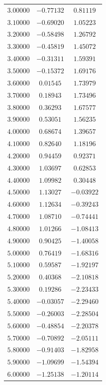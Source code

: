 \documentclass[a4paper,10pt]{article}
\begin{document}
\begin{center}
\begin{longtable}{ |c|c|c| }
$   3.00000 $ & $ -0.77132 $ & $  0.81119$\\
$   3.10000 $ & $ -0.69020 $ & $  1.05223$\\
$   3.20000 $ & $ -0.58498 $ & $  1.26792$\\
$   3.30000 $ & $ -0.45819 $ & $  1.45072$\\
$   3.40000 $ & $ -0.31311 $ & $  1.59391$\\
$   3.50000 $ & $ -0.15372 $ & $  1.69176$\\
$   3.60000 $ & $  0.01545 $ & $  1.73979$\\
$   3.70000 $ & $  0.18943 $ & $  1.73496$\\
$   3.80000 $ & $  0.36293 $ & $  1.67577$\\
$   3.90000  $ & $ 0.53051 $ & $  1.56235$\\
$   4.00000  $ & $ 0.68674 $ & $  1.39657$\\
$   4.10000 $ & $  0.82640  $ & $ 1.18196$\\
$   4.20000 $ & $  0.94459 $ & $  0.92371$\\
$   4.30000$ & $   1.03697$ & $   0.62853$\\
$   4.40000  $ & $ 1.09982  $ & $ 0.30448$\\
$   4.50000  $ & $ 1.13027 $ & $ -0.03922$\\
$   4.60000 $ & $  1.12634$ & $  -0.39243$\\
$   4.70000  $ & $ 1.08710  $ & $-0.74441$\\
$   4.80000 $ & $  1.01266 $ & $ -1.08413$\\
$   4.90000 $ & $  0.90425 $ & $ -1.40058$\\
$   5.00000  $ & $ 0.76419$ & $  -1.68316$\\
$   5.10000 $ & $  0.59587 $ & $ -1.92197$\\
$   5.20000 $ & $  0.40368 $ & $ -2.10818$\\
$   5.30000 $ & $  0.19286 $ & $ -2.23433$\\
$   5.40000  $ & $-0.03057 $ & $ -2.29460$\\
$   5.50000 $ & $ -0.26003 $ & $ -2.28504$\\
$   5.60000 $ & $ -0.48854 $ & $ -2.20378$\\
$   5.70000  $ & $-0.70892 $ & $ -2.05111$\\
$   5.80000 $ & $ -0.91403 $ & $ -1.82958$\\
$   5.90000 $ & $ -1.09699 $ & $ -1.54394$\\
$   6.00000  $ & $-1.25138 $ & $ -1.20114$\\

\end{longtable}
\end{center}
\end{document}
